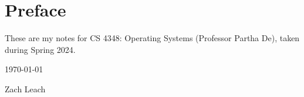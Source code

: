 \chapter*{Preface}

These are my notes for CS 4348: Operating Systems (Professor Partha De), taken during Spring 2024.

\vspace{12pt}
\hfill \today 

\hfill Zach Leach

